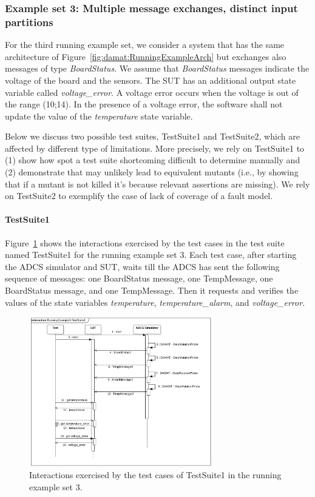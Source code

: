 \clearpage 
\subsubsection{Example set 3: Multiple message exchanges, distinct input partitions}
\label{sec:dataDriven:example:3}

For the third running example set, we consider a system that has the same architecture of  Figure~\ref{fig:damat:RunningExampleArch} but exchanges also messages of type \emph{BoardStatus}. We assume that \emph{BoardStatus} messages indicate the voltage of the board and the sensors. The SUT has an additional output state variable called \emph{voltage\_error}. A voltage error occurs when the voltage is out of the range (10;14). In the presence of a voltage error, the software shall not update the value of the \emph{temperature} state variable.

Below we discuss two possible test suites, TestSuite1 and TestSuite2, which are affected by different type of limitations.
More precisely, we rely on TestSuite1 to (1) show how \APPR spot a test suite shortcoming difficult to determine manually and (2) demonstrate that \APPR may unlikely lead to equivalent mutants (i.e., by showing that if a mutant is not killed it's because relevant assertions are missing). We rely on TestSuite2 to exemplify the case of lack of coverage of a fault model.

\paragraph{TestSuite1}

Figure~\ref{fig:damat:RunningExample3Sequence} shows the interactions exercised by the test cases in the test suite named TestSuite1 for the running example set 3. Each test case, after starting the ADCS simulator and SUT, waits till the ADCS has sent the following sequence of messages: one BoardStatus message, one TempMessage, one BoardStatus message, and one TempMessage. Then it requests and verifies the values of the state variables \emph{temperature}, \emph{temperature\_alarm}, and \emph{voltage\_error}.

\begin{figure}[tb]
\centering
\includegraphics[width=8cm]{damat/images/RunningExampleSequence3.png}
\caption{Interactions exercised by the test cases of TestSuite1 in the running example set 3.}
\label{fig:damat:RunningExample3Sequence}
\end{figure}

